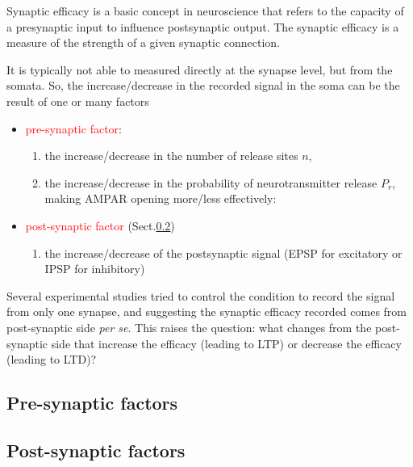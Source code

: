 Synaptic efficacy is a basic concept in neuroscience that refers to the capacity
of a presynaptic input to influence postsynaptic output.
The synaptic efficacy is a measure of the strength of a given synaptic
connection.

It is typically not able to measured directly at the synapse level, but from the
somata. So, the increase/decrease in the recorded signal in the soma can be the
result of one or many factors

\begin{itemize}

  \item \textcolor{red}{pre-synaptic factor}:
  \begin{enumerate}
  \item the increase/decrease in the number of release sites $n$, 
  
  \item the increase/decrease in the probability of neurotransmitter release
  $P_r$, making AMPAR  opening more/less effectively: 
  \end{enumerate}
  
  \item \textcolor{red}{post-synaptic factor}
  (Sect.\ref{sec:synaptic-efficacy-post-synaptic-factors})

  \begin{enumerate}
  \item the increase/decrease of the postsynaptic signal (EPSP for excitatory
  or IPSP for inhibitory)
  
  \end{enumerate} 
\end{itemize}

Several experimental studies tried to control the condition to record the signal
from only one synapse, and suggesting the synaptic efficacy recorded comes from
post-synaptic side {\it per se}. This raises the question: what changes from the
post-synaptic side that increase the efficacy (leading to LTP) or decrease the
efficacy (leading to LTD)?

\subsection{Pre-synaptic factors}
\label{sec:synaptic-efficacy-pre-synaptic-factors}

\subsection{Post-synaptic factors}
\label{sec:synaptic-efficacy-post-synaptic-factors}

